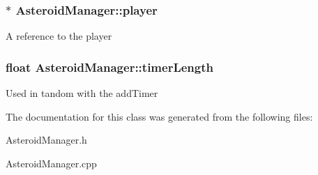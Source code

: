 \subsubsection[{\texorpdfstring{player}{player}}]{$\ast$ Asteroid\+Manager\+::player}\hypertarget{class_asteroid_manager_a35e449894f3f0e715fd5f5aad03619d5}{}\label{class_asteroid_manager_a35e449894f3f0e715fd5f5aad03619d5}
A reference to the player 
\subsubsection[{\texorpdfstring{timer\+Length}{timerLength}}]{\setlength{\rightskip}{0pt plus 5cm}float Asteroid\+Manager\+::timer\+Length\hspace{0.3cm}{\ttfamily [private]}}\hypertarget{class_asteroid_manager_aca7c60ae9430d71d66e8dd012962dfdb}{}\label{class_asteroid_manager_aca7c60ae9430d71d66e8dd012962dfdb}
Used in tandom with the add\+Timer 

The documentation for this class was generated from the following files\+:\begin{DoxyCompactItemize}
\item 
Asteroid\+Manager.\+h\item 
Asteroid\+Manager.\+cpp\end{DoxyCompactItemize}
